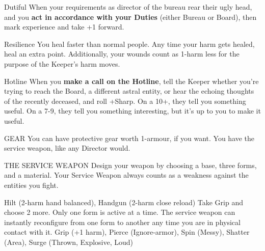 {%
}{%
%
\begin{move}[]{Dutiful}
When your requirements as director of the bureau rear their ugly head, and you \textbf{act in accordance with your Duties} (either Bureau or Board), then mark experience and take +1 forward.
\end{move}%
\br[1mm]
%
\begin{move}{Resilience}
You heal faster than normal people.  Any time your harm gets healed, heal an extra point.  Additionally, your wounds count as 1-harm less for the purpose of the Keeper’s harm moves.
\end{move}%
\br[1mm]
%
\begin{move}{Hotline}
When you \textbf{make a call on the Hotline}, tell the Keeper whether you’re trying to reach the Board, a different astral entity, or hear the echoing thoughts of the recently deceased, and roll +Sharp.  On a 10+, they tell you something useful.  On a 7-9, they tell you something interesting, but it’s up to you to make it useful.
\end{move}%
\br[4mm]
%
\begin{pbsect}{GEAR}
You can have protective gear worth 1-armour, if you want.  You have the service weapon, like any Director would.
\end{pbsect}
%
\begin{pbsect}{THE SERVICE WEAPON}
Design your weapon by choosing a base, three forms, and a material.  Your Service Weapon always counts as a weakness against the entities you fight.
\end{pbsect}%
\br[2mm]
%
%
{Hilt (2-harm hand balanced),
Handgun (2-harm close reload)}%
\br[2mm]
%
%
{Take Grip and choose 2 more.  Only one form is active at a time.  The service weapon can instantly reconfigure from one form to another any time you are in physical contact with it.}%
    {Grip (+1 harm),
    Pierce (Ignore-armor),
    Spin (Messy),
    Shatter (Area),
    {Surge (Thrown, Explosive, Loud)}}%
%
}\pagebreak%
%

